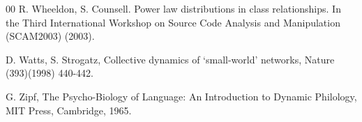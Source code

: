 \documentclass{elsart}
\begin{document}
\begin{thebibliography}{00}
R. Wheeldon, S. Counsell. Power law distributions in class relationships. In the Third International Workshop on 
Source Code Analysis and Manipulation (SCAM2003) (2003).

D. Watts, S. Strogatz, Collective dynamics of `small-world' networks, Nature (393)(1998) 440-442.

G. Zipf, The Psycho-Biology of Language: An Introduction to Dynamic Philology, MIT Press, Cambridge, 1965.





\end{thebibliography}
\end{document}
